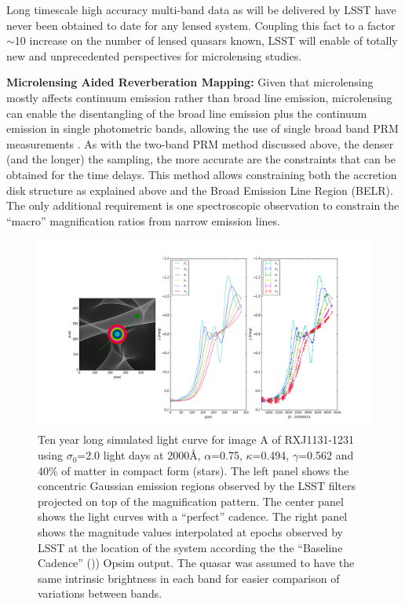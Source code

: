 Long timescale high accuracy multi-band data as will be delivered by
LSST have never been obtained to date for any lensed system. Coupling this fact
to a factor $\sim$10 increase on the number of lensed quasars known, LSST will
enable of totally new and unprecedented perspectives for microlensing studies.

%

{\bf Microlensing Aided Reverberation Mapping:} Given that microlensing mostly
affects continuum emission rather than  broad line emission, microlensing can enable
the disentangling of the broad line emission plus the continuum emission in single
photometric bands, allowing the use of single broad band PRM measurements
\citep{SluseandTewes2014}. As with the two-band PRM method discussed above, the
denser (and the longer) the sampling, the more accurate are the constraints that
can be obtained for the time delays. This method allows constraining both the
accretion disk structure as explained above and the Broad Emission Line Region (BELR). The only additional
requirement is one spectroscopic observation to constrain the ``macro''
magnification ratios from narrow emission lines.

\begin{center}
	\begin{figure}[hbt]
		\includegraphics[width=\textwidth]{figs/agn/sim_ex.png}
		\caption{Ten year long simulated light curve for image A of RXJ1131-1231 using $\sigma_0$=2.0 light days at 2000\AA{}, $\alpha$=0.75, $\kappa$=0.494, $\gamma$=0.562 and 40\% of matter in compact form (stars). The left panel shows the concentric Gaussian emission regions observed by the LSST filters projected on top of the magnification pattern. The center panel shows the light curves with a ``perfect'' cadence. The right panel shows the magnitude values interpolated at epochs observed by LSST at the location of the system according the the ``Baseline Cadence'' ()) Opsim output. The quasar was assumed to have the same intrinsic brightness in each band for easier comparison of variations between bands.}
		\label{microsimcurve}
	\end{figure}
\end{center}

